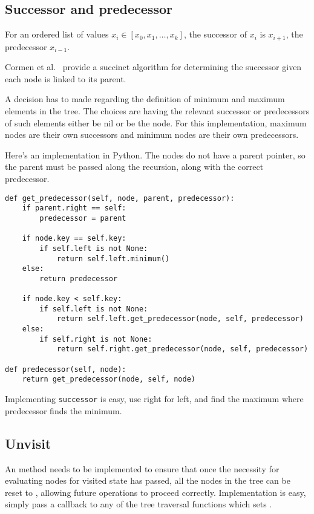 \documentclass{article}
\begin{document}
\subsection{Successor and predecessor}

\setcounter{sno}{0}

\sno For an ordered list of values $x_i \in [x_0, x_1,\ldots,x_k]$, the successor of
$x_i$ is $x_{i+1}$, the predecessor $x_{i-1}$.

\sno Cormen et al.~\cite[p. 248-249]{cormen:th:1990} provide a succinct algorithm for
determining the successor given each node is linked to its parent.

\sno A decision has to made regarding the definition of minimum and maximum
elements in the tree. \sno The choices are having the relevant successor or
predecessors of such elements either be nil or be the node. \sno For this implementation,
maximum nodes are their own successors and minimum nodes are their
own predecessors.

\sno Here's an implementation in Python. \sno The nodes do not have a parent
pointer, so the parent must be passed along the recursion, along with
the correct predecessor.

\begin{lstlisting}[frame=single]
def get_predecessor(self, node, parent, predecessor):
    if parent.right == self:
        predecessor = parent

    if node.key == self.key:
        if self.left is not None:
            return self.left.minimum()
    else:
        return predecessor

    if node.key < self.key:
        if self.left is not None:
            return self.left.get_predecessor(node, self, predecessor)
    else:
        if self.right is not None:
            return self.right.get_predecessor(node, self, predecessor)

def predecessor(self, node):
    return get_predecessor(node, self, node)
\end{lstlisting}

\sno Implementing {\tt successor} is easy, use right for left, and find the
maximum where predecessor finds the minimum.

\subsection{Unvisit}

An  method needs to be implemented to ensure that once the
necessity for evaluating nodes for visited state has passed, all
the nodes in the tree can be reset to , allowing
future operations to proceed correctly. Implementation is easy,
simply pass a callback to any of the tree traversal functions which
sets .
\end{document}
